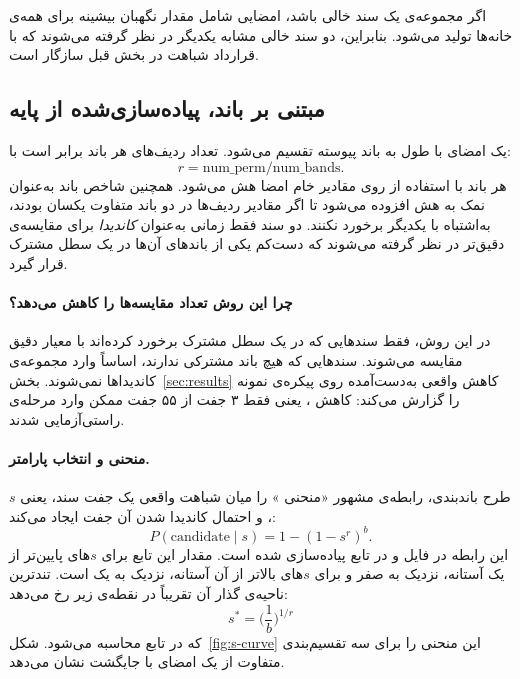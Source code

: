 \documentclass[11pt,a4paper]{article}
\begin{document}
	اگر مجموعه‌ی  یک سند خالی باشد، امضایی شامل مقدار نگهبان بیشینه برای همه‌ی خانه‌ها تولید می‌شود. بنابراین، دو سند خالی مشابه یکدیگر در نظر گرفته می‌شوند که با قرارداد شباهت  در بخش قبل سازگار است.
	
	\subsection{ مبتنی بر باند، پیاده‌سازی‌شده از پایه}
	
	یک امضای  با طول  به  باند پیوسته تقسیم می‌شود. تعداد ردیف‌های هر باند برابر است با:
	$$
	r = \text{num\_perm} / \text{num\_bands}.
	$$
	هر باند با استفاده از  روی مقادیر خام امضا هش می‌شود. همچنین شاخص باند به‌عنوان نمک به هش افزوده می‌شود تا اگر مقادیر ردیف‌ها در دو باند متفاوت یکسان بودند، به‌اشتباه با یکدیگر برخورد نکنند. دو سند فقط زمانی به‌عنوان \emph{کاندیدا} برای مقایسه‌ی دقیق‌تر در نظر گرفته می‌شوند که دست‌کم یکی از باندهای آن‌ها در یک سطل مشترک قرار گیرد.
	
	\paragraph{چرا این روش تعداد مقایسه‌ها را کاهش می‌دهد؟}
	در این روش، فقط سندهایی که در یک سطل مشترک برخورد کرده‌اند با معیار دقیق  مقایسه می‌شوند. سندهایی که هیچ باند مشترکی ندارند، اساساً وارد مجموعه‌ی کاندیداها نمی‌شوند. بخش~\ref{sec:results} کاهش واقعی به‌دست‌آمده روی پیکره‌ی نمونه را گزارش می‌کند: کاهش ، یعنی فقط ۳ جفت از ۵۵ جفت ممکن وارد مرحله‌ی راستی‌آزمایی شدند.
	
	\paragraph{منحنی  و انتخاب پارامتر.}
	طرح باندبندی، رابطه‌ی مشهور «منحنی » را میان شباهت واقعی  یک جفت سند، یعنی $s$، و احتمال کاندیدا شدن آن جفت ایجاد می‌کند:
	$$
	P(\text{candidate} \mid s) = 1 - (1 - s^r)^b.
	$$
	این رابطه در فایل  و در تابع  پیاده‌سازی شده است. مقدار این تابع برای $s$های پایین‌تر از یک آستانه، نزدیک به صفر و برای $s$های بالاتر از آن آستانه، نزدیک به یک است. تندترین ناحیه‌ی گذار آن تقریباً در نقطه‌ی زیر رخ می‌دهد:
	$$
	s^{*} = \Big(\frac{1}{b}\Big)^{1/r}
	$$
	که در تابع  محاسبه می‌شود. شکل~\ref{fig:s-curve} این منحنی را برای سه تقسیم‌بندی متفاوت  از یک امضای  با  جایگشت نشان می‌دهد.
	
\end{document}
